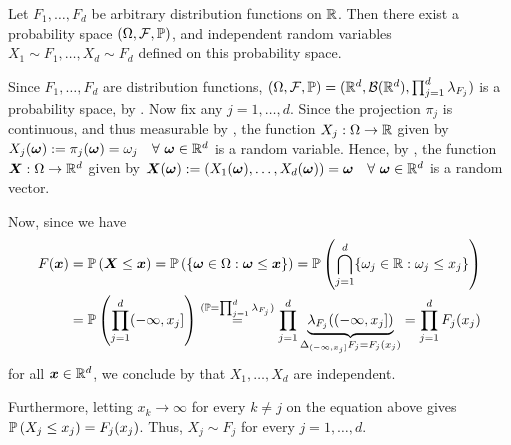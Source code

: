 \begin{enumerate}
\begin{proposition}
\label{prp:construct-ind-rvs}
Let \(F_1,\dotsc,F_d\) be arbitrary distribution functions on \(\mathbb{R}\). Then
there exist a probability space \((\Omega,\mathcal{F},\mathbb{P})\), and independent
random variables \(X_1\sim F_1,\dotsc,X_d\sim F_d\) defined on this probability
space.
\end{proposition}
\begin{pf}
Since \(F_1,\dotsc,F_d\) are distribution functions,
\((\Omega,\mathcal{F},\mathbb{P})=(\mathbb{R}^{d},\mathcal{B}(\mathbb{R}^{d}),\prod_{j=1}^{d}\lambda_{F_j})\)
is a probability space, by . Now fix any
\(j=1,\dotsc,d\). Since the projection \(\pi_{j}\) is continuous, and thus
measurable by , the function \(X_j:\Omega\to\mathbb{R}\) given by
\(X_j(\bm{\omega}):=\pi_j(\bm{\omega})=\omega_j\quad\forall~
\bm{\omega}\in\mathbb{R}^d\) is a random variable.  Hence, by
, the function \(\bm{X}:\Omega\to\mathbb{R}^d\) given by
\(\bm{X}(\bm{\omega}):=(X_1(\bm{\omega}),\dotsc,X_d(\bm{\omega}))
=\bm{\omega}\quad\forall~\bm{\omega}\in\mathbb{R}^d\) is a
random vector.

Now, since we have
\begin{align*}
F(\bm{x})&=\mathbb{P}\left(\bm{X}\le\bm{x}\right)=\mathbb{P}\left(\{\bm{\omega}\in\Omega:\bm{\omega}\le\bm{x}\}\right)
=\mathbb{P}\left(\bigcap_{j=1}^{d}\{\omega_j\in\mathbb{R}:\omega_j\le x_j\}\right) \\
&=\mathbb{P}\left(\prod_{j=1}^{d}(-\infty,x_j]\right)
\overset{(\mathbb{P}=\prod_{j=1}^{d}\lambda_{F_j})}{=}\prod_{j=1}^{d}
\underbrace{\lambda_{F_j}((-\infty,x_j])}_{\Delta_{(-\infty,x_j]}F_j=F_j(x_j)}
=\prod_{j=1}^{d}F_j(x_j)
\end{align*}
for all \(\bm{x}\in\mathbb{R}^d\), we conclude by  that
\(X_1,\dotsc,X_d\) are independent.

Furthermore, letting \(x_k\to\infty\) for every \(k\ne j\) on the equation
above gives \(\mathbb{P}\left(X_j\le x_j\right)=F_j(x_j)\). Thus, \(X_j\sim F_j\) for every
\(j=1,\dotsc,d\).
\end{pf}


\end{enumerate}
